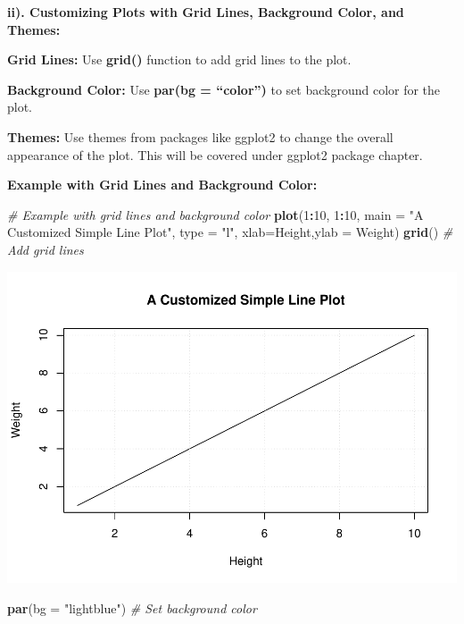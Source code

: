 \documentclass[
]{book}
\newenvironment{Shaded}{\begin{snugshade}}{\end{snugshade}}
\newcommand{\AttributeTok}[1]{\textcolor[rgb]{0.13,0.29,0.53}{#1}}
\newcommand{\CommentTok}[1]{\textcolor[rgb]{0.56,0.35,0.01}{\textit{#1}}}
\newcommand{\DecValTok}[1]{\textcolor[rgb]{0.00,0.00,0.81}{#1}}
\newcommand{\FunctionTok}[1]{\textcolor[rgb]{0.13,0.29,0.53}{\textbf{#1}}}
\newcommand{\NormalTok}[1]{#1}
\newcommand{\SpecialCharTok}[1]{\textcolor[rgb]{0.81,0.36,0.00}{\textbf{#1}}}
\newcommand{\StringTok}[1]{\textcolor[rgb]{0.31,0.60,0.02}{#1}}
\begin{document}
\textbf{ii). Customizing Plots with Grid Lines, Background Color, and Themes:}

\textbf{Grid Lines:} Use \textbf{grid()} function to add grid lines to the plot.

\textbf{Background Color:} Use \textbf{par(bg = ``color'')} to set background color for the plot.

\textbf{Themes:} Use themes from packages like ggplot2 to change the overall appearance of the plot. This will be covered under ggplot2 package chapter.

\textbf{Example with Grid Lines and Background Color:}

\begin{Shaded}
\begin{Highlighting}[]
\CommentTok{\# Example with grid lines and background color}
\FunctionTok{plot}\NormalTok{(}\DecValTok{1}\SpecialCharTok{:}\DecValTok{10}\NormalTok{, }\DecValTok{1}\SpecialCharTok{:}\DecValTok{10}\NormalTok{, }\AttributeTok{main =} \StringTok{"A Customized Simple Line Plot"}\NormalTok{, }\AttributeTok{type =} \StringTok{"l"}\NormalTok{, }\AttributeTok{xlab=}\StringTok{\textquotesingle{}Height\textquotesingle{}}\NormalTok{,}\AttributeTok{ylab =} \StringTok{\textquotesingle{}Weight\textquotesingle{}}\NormalTok{)}
\FunctionTok{grid}\NormalTok{() }\CommentTok{\# Add grid lines}
\end{Highlighting}
\end{Shaded}

\includegraphics{_main_files/figure-latex/unnamed-chunk-48-1.pdf}

\begin{Shaded}
\begin{Highlighting}[]
\FunctionTok{par}\NormalTok{(}\AttributeTok{bg =} \StringTok{"lightblue"}\NormalTok{) }\CommentTok{\# Set background color}
\end{Highlighting}
\end{Shaded}
\end{document}
